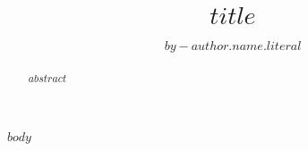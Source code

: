 \documentclass[9pt,lineno]{elife}
\title{$title$}
\author{$by-author.name.literal$}
\begin{document}
\maketitle

\begin{abstract}
$abstract$
\end{abstract}

$body$
\end{document}
